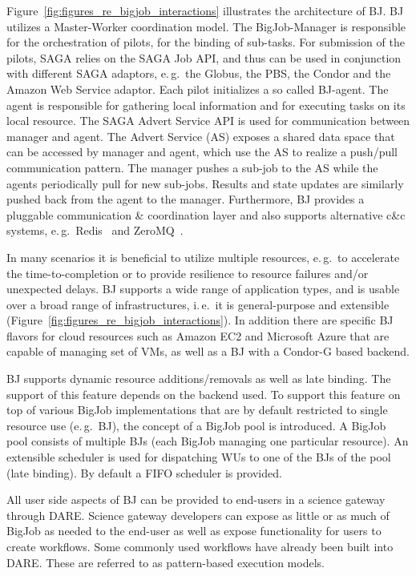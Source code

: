 \documentclass[]{svjour3}
\begin{document}
Figure~\ref{fig:figures_re_bigjob_interactions} illustrates the
architecture of BJ. BJ utilizes a Master-Worker coordination model. The
BigJob-Manager is responsible for the orchestration of pilots, for the
binding of sub-tasks. For submission of the pilots, SAGA relies on the
SAGA Job API, and thus can be used in conjunction with different SAGA
adaptors, e.\,g.\ the Globus, the PBS, the Condor and the Amazon Web
Service adaptor. Each pilot initializes a so called BJ-agent. The
agent is responsible for gathering local information and for executing
tasks on its local resource. The SAGA Advert Service API is used for
communication between manager and agent. The Advert Service (AS)
exposes a shared data space that can be accessed by manager and agent,
which use the AS to realize a push/pull communication pattern.
The manager pushes a sub-job to the AS while the agents periodically pull
for new sub-jobs. Results and state updates are similarly pushed back from
the agent to the manager. Furthermore, BJ provides a pluggable
communication \& coordination layer and also supports alternative c\&c
systems, e.\,g.\ Redis~\cite{redis} and ZeroMQ~\cite{zmq}.

In many scenarios it is beneficial to utilize multiple resources,
e.\,g.\ to accelerate the time-to-completion or to provide resilience
to resource failures and/or unexpected delays. 
BJ supports a wide range of application types, and is usable over a
broad range of infrastructures, i.\,e.\ it is general-purpose and
extensible (Figure~\ref{fig:figures_re_bigjob_interactions}). In
addition there are specific BJ flavors for cloud resources such as
Amazon EC2 and Microsoft Azure that are capable of managing set of
VMs, as well as a BJ with a Condor-G based backend.

BJ supports dynamic resource additions/removals as well as late
binding. The support of this feature depends on the backend used. To
support this feature on top of various BigJob implementations that are
by default restricted to single resource use (e.\,g.\ BJ), the concept
of a BigJob pool is introduced. A BigJob pool consists of multiple BJs
(each BigJob managing one particular resource). An extensible
scheduler is used for dispatching WUs to one of the BJs of the pool
(late binding). By default a FIFO scheduler is provided.

  All user side aspects of BJ can be provided to end-users
in a science gateway through DARE. Science gateway developers can
expose as little or as much of BigJob as needed to the end-user as
well as expose functionality for users to create workflows. Some
commonly used workflows have already been built into DARE. These are
referred to as pattern-based execution models.
\end{document}

